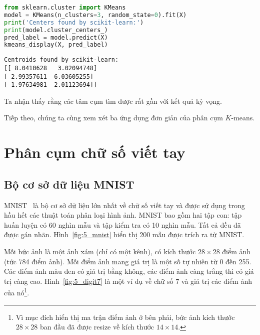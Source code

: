 \begin{lstlisting}[language=Python]
from sklearn.cluster import KMeans
model = KMeans(n_clusters=3, random_state=0).fit(X)
print('Centers found by scikit-learn:')
print(model.cluster_centers_)
pred_label = model.predict(X)
kmeans_display(X, pred_label)
\end{lstlisting}
\kq
\begin{lstlisting}
Centroids found by scikit-learn:
[[ 8.0410628   3.02094748]
[ 2.99357611  6.03605255]
[ 1.97634981  2.01123694]]
\end{lstlisting}
Ta nhận thấy rằng các tâm cụm tìm được rất gần với kết quả kỳ vọng.

Tiếp theo, chúng ta cùng xem xét ba ứng dụng đơn giản của phân cụm $K$-means.






\section{Phân cụm chữ số viết tay }

\subsection{Bộ cơ sở dữ liệu MNIST }

MNIST~\cite{lecun2010mnist} là bộ cơ sở dữ liệu lớn nhất về chữ số viết tay và
được sử dụng trong hầu hết các thuật toán phân loại hình ảnh. MNIST bao gồm hai
tập con: tập huấn luyện có 60 nghìn mẫu và tập kiểm tra có 10 nghìn mẫu. Tất cả
đều đã được gán nhãn. Hình~\ref{fig:5_mnist} hiển thị 200 mẫu được trích ra từ
MNIST.




Mỗi bức ảnh là một ảnh xám (chỉ có một kênh), có kích thước $28\times28$
điểm ảnh (tức 784 điểm ảnh). Mỗi điểm ảnh mang giá trị là một số tự nhiên từ 0
đến 255. Các điểm ảnh màu đen có giá trị bằng không, các điểm ảnh càng trắng thì có giá trị càng cao. Hình~\ref{fig:5_digit7} là một ví dụ về chữ
số 7 và giá trị các điểm ảnh của nó\footnote{Vì mục đích hiển thị ma trận điểm ảnh ở
bên phải, bức ảnh kích thước $28 \times 28$ ban đầu đã được resize về kích thước
$14 \times 14$.}.

